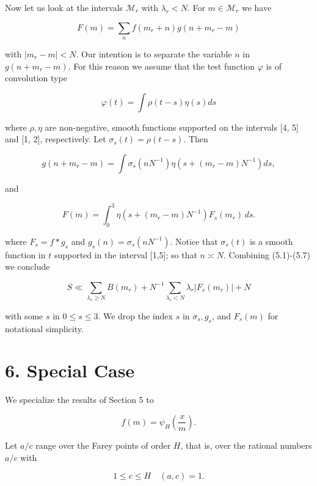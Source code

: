 \documentclass[10pt]{article}
\begin{document}
Now let us look at the intervals $\mathscr{M}_{r}$ with $\lambda_{r}<N$. For $m \in \mathscr{M}_{r}$ we have

$$
F(m)=\sum_{n} f\left(m_{r}+n\right) g\left(n+m_{r}-m\right)
$$

with $\left|m_{r}-m\right|<N$. Our intention is to separate the variable $n$ in $g\left(n+m_{r}-m\right)$. For this reason we assume that the test function $\varphi$ is of convolution type

$$
\varphi(t)=\int \rho(t-s) \eta(s) d s
$$

where $\rho, \eta$ are non-negative, smooth functions supported on the intervals [4, 5] and [1, 2], respectively. Let $\sigma_{s}(t)=\rho(t-s)$. Then

$$
g\left(n+m_{r}-m\right)=\int \sigma_{s}\left(n N^{-1}\right) \eta\left(s+\left(m_{r}-m\right) N^{-1}\right) d s,
$$

and


\begin{equation*}
F(m)=\int_{0}^{3}\eta\left(s+(m_{r}-m)N^{-1}\right)F_{s}(m_{r})\,ds. \tag{5.7}
\end{equation*}


where $F_{s}=f * g_{s}$ and $g_{s}(n)=\sigma_{s}\left(n N^{-1}\right)$. Notice that $\sigma_{s}(t)$ is a smooth function in $t$ supported in the interval [1,5]; so that $n \asymp N$. Combining (5.1)-(5.7) we conclude


\begin{equation*}
S \ll \sum_{\lambda_{r} \geqslant N} B\left(m_{r}\right)+N^{-1} \sum_{\lambda_{r}<N} \lambda_{r}\left|F_{s}\left(m_{r}\right)\right|+N \tag{5.8}
\end{equation*}


with some $s$ in $0 \leqslant s \leqslant 3$.
We drop the index $s$ in $\sigma_{s}, g_{s}$, and $F_{s}(m)$ for notational simplicity.

\section*{6. Special Case}
We specialize the results of Section 5 to

$$
f(m)=\psi_{H}\left(\frac{x}{m}\right) .
$$

Let $a/c$ range over the Farey points of order $H$, that is, over the rational numbers $a/c$ with


\begin{equation*}
1 \leqslant c \leqslant H \quad(a, c)=1 . \tag{6.1}
\end{equation*}
\end{document}

